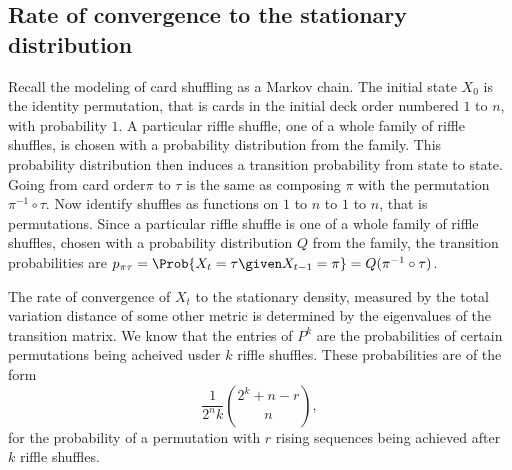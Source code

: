 \documentclass[12pt]{article}
\begin{document}
\subsection*{Rate of convergence to the stationary distribution}

Recall the modeling of card shuffling as a Markov chain.  The initial
state \( X_0 \) is the identity permutation, that is cards in the
initial deck order numbered \( 1 \) to \(n \), with probability
\( 1 \).  A particular riffle shuffle, one of a whole family of riffle
shuffles, is chosen with a probability distribution from the family.
This probability distribution then induces a transition probability
from state to state.  Going from card order\( \pi \) to \( \tau \) is
the same as composing \( \pi \) with the permutation
\( \pi^{-1} \circ \tau \).  Now identify shuffles as functions on
\( 1 \) to \( n \) to \( 1 \) to \( n \), that is permutations.  Since
a particular riffle shuffle is one of a whole family of riffle
shuffles, chosen with a probability distribution \( Q \) from the
family, the transition probabilities are
\( p_{\pi \tau} = \Prob{X_t = \tau \given X_{t-1} = \pi} = Q(\pi^{-1}
\circ \tau) \).

The rate of convergence of \( X_t \) to the stationary density,
measured by the total variation distance of some other metric is
determined by the eigenvalues of the transition matrix.  We know that
the entries of \( P^k \) are the probabilities of certain permutations
being acheived usder \( k \) riffle shuffles.  These probabilities are
of the form
\[
    \frac{1}{2^nk} \binom{2^k +n - r}{n},
\] for the probability of a permutation with \( r \) rising sequences
being achieved after \( k \) riffle shuffles.
\end{document}
